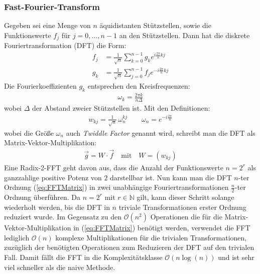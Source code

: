 \documentclass[10pt,a4paper]{article}
\begin{document}
\subsubsection{Fast-Fourier-Transform}
Gegeben sei eine Menge von $n$ äquidistanten Stützstellen, sowie die Funktionswerte $f_j$ für $j = 0, \dots, n-1$ an den Stützstellen. Dann hat die diskrete Fouriertransformation (DFT) die Form:
\begin{align}
  f_j &= \frac{1}{\sqrt{n}} \sum_{k = 0}^{n - 1} g_k e^{i \frac{2 \pi}{n} k j} \\
  g_k &= \frac{1}{\sqrt{n}} \sum_{j = 0}^{n - 1} f_j e^{-i \frac{2 \pi}{n} k j}
\end{align}
Die Fourierkoeffizienten $g_k$ entsprechen den Kreisfrequenzen:
\begin{align}
  \omega_k = \frac{2 \pi k}{n \Delta}
  \label{kreisfrequenz}
\end{align}
wobei $\Delta$ der Abstand zweier Stützstellen ist. Mit den Definitionen:
\begin{align}
  w_{k j} = \frac{1}{\sqrt{n}} \, \omega_n^{k j} \qquad \omega_n = e^{-i \frac{2 \pi}{n}}
\end{align}
wobei die Größe $\omega_n$ auch \emph{Twiddle Factor} genannt wird, schreibt man die DFT als Matrix-Vektor-Multiplikation:
\begin{align}
  \vec{g} = W \cdot \vec{f} \quad \text{mit} \quad W = (w_{k j})
  \label{eq:FFTMatrix}
\end{align}
Eine Radix-2-FFT geht davon aus, dass die Anzahl der Funktionswerte $n = 2^r$ als ganzzahlige positive Potenz von $2$ darstellbar ist. Nun kann man die DFT $n$-ter Ordnung (\ref{eq:FFTMatrix}) in zwei unabhängige Fouriertransformationen $\frac{n}{2}$-ter Ordnung überführen. Da $n = 2^r$ mit $r \in \mathbb{N}$ gilt, kann dieser Schritt solange wiederholt werden, bis die DFT in $n$ triviale Transformationen erster Ordnung reduziert wurde. Im Gegensatz zu den $\mathcal O (n^2)$ Operationen die für die Matrix-Vektor-Multiplikation in (\ref{eq:FFTMatrix}) benötigt werden, verwendet die FFT lediglich $\mathcal O (n)$ komplexe Multiplikationen für die trivialen Transformationen, zuzüglich der benötigten Operationen zum Reduzieren der DFT auf den trivialen Fall. Damit fällt die FFT in die Komplexitätsklasse $\mathcal O (n \log(n))$ und ist sehr viel schneller als die naive Methode.
\end{document}
